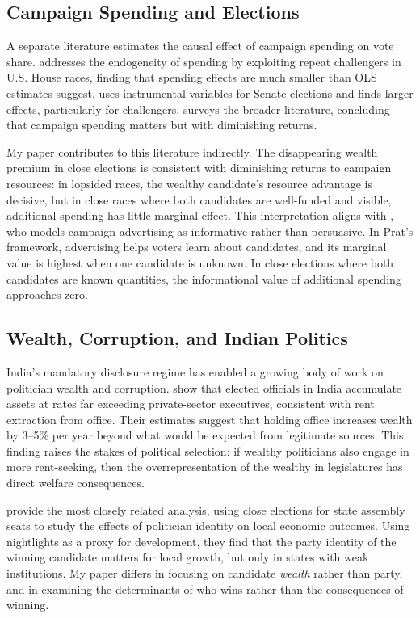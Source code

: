 \documentclass[12pt]{article}
\begin{document}
\subsection{Campaign Spending and Elections}

A separate literature estimates the causal effect of campaign spending on vote share. \citet{levitt1994using} addresses the endogeneity of spending by exploiting repeat challengers in U.S. House races, finding that spending effects are much smaller than OLS estimates suggest. \citet{gerber1998estimating} uses instrumental variables for Senate elections and finds larger effects, particularly for challengers. \citet{stratmann2005some} surveys the broader literature, concluding that campaign spending matters but with diminishing returns.

My paper contributes to this literature indirectly. The disappearing wealth premium in close elections is consistent with diminishing returns to campaign resources: in lopsided races, the wealthy candidate's resource advantage is decisive, but in close races where both candidates are well-funded and visible, additional spending has little marginal effect. This interpretation aligns with \citet{prat2002campaign}, who models campaign advertising as informative rather than persuasive. In Prat's framework, advertising helps voters learn about candidates, and its marginal value is highest when one candidate is unknown. In close elections where both candidates are known quantities, the informational value of additional spending approaches zero.

\subsection{Wealth, Corruption, and Indian Politics}

India's mandatory disclosure regime has enabled a growing body of work on politician wealth and corruption. \citet{fisman2014corruption} show that elected officials in India accumulate assets at rates far exceeding private-sector executives, consistent with rent extraction from office. Their estimates suggest that holding office increases wealth by 3--5\% per year beyond what would be expected from legitimate sources. This finding raises the stakes of political selection: if wealthy politicians also engage in more rent-seeking, then the overrepresentation of the wealthy in legislatures has direct welfare consequences.

\citet{asher2017politics} provide the most closely related analysis, using close elections for state assembly seats to study the effects of politician identity on local economic outcomes. Using nightlights as a proxy for development, they find that the party identity of the winning candidate matters for local growth, but only in states with weak institutions. My paper differs in focusing on candidate \textit{wealth} rather than party, and in examining the determinants of who wins rather than the consequences of winning.
\end{document}
